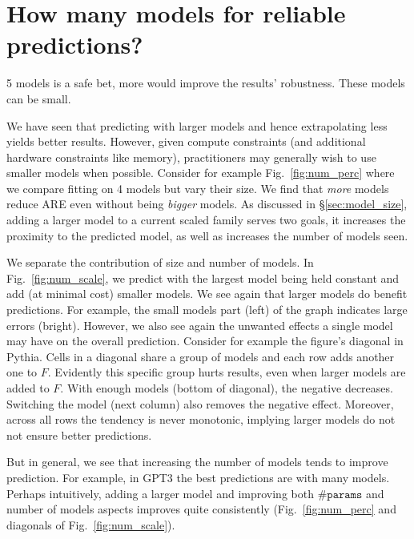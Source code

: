 \documentclass{article}
\theoremstyle{plain}
\theoremstyle{definition}
\theoremstyle{remark}
\newcommand{\mathmsize}{\#\texttt{params}}
\newcommand{\msize}{$\mathmsize{}$}
\newcommand{\summarybox}[1]{
  \begin{tcolorbox}[
    enhanced,
    colback=olive!8,
    colframe=olive!50,
    boxrule=0.5pt,
    left=8pt,
    right=8pt,
    top=6pt,
    bottom=6pt,
    arc=1.5mm,
    boxsep=0pt,
    fontupper=\normalfont\small\itshape,
    frame hidden,
    before skip=0pt,  %
    after skip=8pt,   %
  ]
    #1
  \end{tcolorbox}
}
\begin{document}
\section{How many models for reliable predictions?} \label{sec:num_models}
\summarybox{5 models is a safe bet, more would improve the results' robustness. These models can be small.}
We have seen that predicting with larger models and hence extrapolating less yields better results. However, given compute constraints (and additional hardware constraints like memory), practitioners may generally wish to use smaller models when possible. 
Consider for example Fig.~\ref{fig:num_perc} where we compare fitting on 4 models but vary their size. We find that \textit{more} models reduce ARE even without being \textit{bigger} models. As discussed in \S\ref{sec:model_size}, adding a larger model to a current scaled family serves two goals, it increases the proximity to the predicted model, as well as increases the number of models seen. 



We separate the contribution of size and number of models. In Fig.~\ref{fig:num_scale}, we predict with the largest model being held constant and add (at minimal cost) smaller models. We see again that larger models do benefit predictions. For example, the small models part (left) of the graph indicates large errors (bright). However, we also see again the unwanted effects a single model may have on the overall prediction. Consider for example the figure's diagonal in Pythia. Cells in a diagonal share a group of models and each row adds another one to $F$. Evidently this specific group hurts results, even when larger models are added to $F$. With enough models (bottom of diagonal), the negative decreases. Switching the model (next column) also removes the negative effect. Moreover, across all rows the tendency is never monotonic, implying larger models do not not ensure better predictions.

But in general, we see that increasing the number of models tends to improve prediction. For example, in GPT3 the best predictions are with many models. Perhaps intuitively, adding a larger model and improving both \msize{} and number of models aspects improves quite consistently (Fig.~\ref{fig:num_perc} and diagonals of Fig.~\ref{fig:num_scale}).

\end{document}
